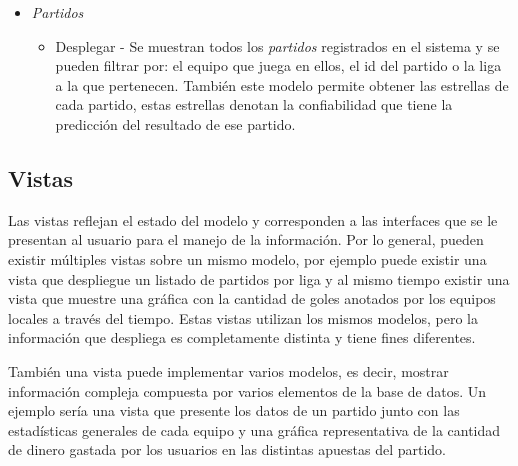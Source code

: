 \begin{itemize}
\begin{itemize}
				\end{itemize}
			\item \emph{Partidos}
				\begin{itemize}
					\item Desplegar - Se muestran todos los \emph{partidos} registrados en el sistema y se pueden filtrar por: el equipo que juega en ellos, el id del partido o la liga a la que pertenecen. También este modelo permite obtener las estrellas de cada partido, estas estrellas denotan la confiabilidad que tiene la predicción del resultado de ese partido.
				\end{itemize}
		\end{itemize}
	
		\subsection{Vistas}
		
		\graphicspath{{/Users/brunomedina/Dropbox/Tesis-Egobets/egobets-notas/resources/vistas/}}
		
		Las vistas reflejan el estado del modelo y corresponden a las interfaces que se le presentan al usuario para el manejo de la información. Por lo general, pueden existir múltiples vistas sobre un mismo modelo, por ejemplo puede existir una vista que despliegue un listado de  partidos por liga y al mismo tiempo existir una vista que muestre una gráfica con la cantidad de goles anotados por los equipos locales a través del tiempo. Estas vistas utilizan los mismos modelos, pero la información que despliega es completamente distinta y tiene fines diferentes.
		
		También una vista puede implementar varios modelos, es decir, mostrar información compleja compuesta por varios elementos de la base de datos. Un ejemplo sería una vista que presente los datos de un partido junto con las estadísticas generales de cada equipo y una gráfica representativa de la cantidad de dinero gastada por los usuarios en las distintas apuestas del partido.
		
